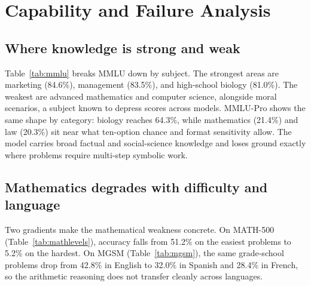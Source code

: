 \section{Capability and Failure Analysis}
\label{sec:analysis}

\subsection{Where knowledge is strong and weak}
Table~\ref{tab:mmlu} breaks MMLU down by subject. The strongest areas are marketing (84.6\%), management (83.5\%), and high-school biology (81.0\%). The weakest are advanced mathematics and computer science, alongside moral scenarios, a subject known to depress scores across models. MMLU-Pro shows the same shape by category: biology reaches 64.3\%, while mathematics (21.4\%) and law (20.3\%) sit near what ten-option chance and format sensitivity allow. The model carries broad factual and social-science knowledge and loses ground exactly where problems require multi-step symbolic work.

\begin{table}[t]
\centering
\caption{MMLU accuracy by subject, strongest and weakest ten (5-shot).}
\label{tab:mmlu}

\end{table}

\subsection{Mathematics degrades with difficulty and language}
Two gradients make the mathematical weakness concrete. On MATH-500 (Table~\ref{tab:mathlevels}), accuracy falls from 51.2\% on the easiest problems to 5.2\% on the hardest. On MGSM (Table~\ref{tab:mgsm}), the same grade-school problems drop from 42.8\% in English to 32.0\% in Spanish and 28.4\% in French, so the arithmetic reasoning does not transfer cleanly across languages.

\begin{table}[t]
\centering
\begin{minipage}[t]{0.48\linewidth}
\centering
\caption{MATH-500 by difficulty level (1 easiest, 5 hardest).}
\label{tab:mathlevels}

\end{minipage}\hfill
\begin{minipage}[t]{0.48\linewidth}
\centering
\caption{MGSM by language.}
\label{tab:mgsm}

\end{minipage}
\end{table}


